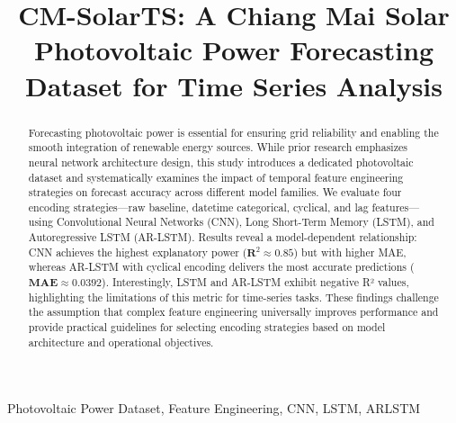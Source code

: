 \documentclass[conference]{IEEEtran}
\begin{document}
	
	\title{CM-SolarTS: A Chiang Mai Solar Photovoltaic Power Forecasting Dataset for Time Series Analysis \\
	}
	
	\author{
		
		\and
	}
	
	\maketitle
	
	\begin{abstract}
	Forecasting photovoltaic power is essential for ensuring grid reliability and enabling the smooth integration of renewable energy sources. While prior research emphasizes neural network architecture design, this study introduces a dedicated photovoltaic dataset and systematically examines the impact of temporal feature engineering strategies on forecast accuracy across different model families. We evaluate four encoding strategies—raw baseline, datetime categorical, cyclical, and lag features—using Convolutional Neural Networks (CNN), Long Short-Term Memory (LSTM), and Autoregressive LSTM (AR-LSTM). Results reveal a model-dependent relationship: CNN achieves the highest explanatory power ($\mathbf{R}^{2} \approx 0.85$) but with higher MAE, whereas AR-LSTM with cyclical encoding delivers the most accurate predictions ($\mathbf{MAE} \approx 0.0392$). Interestingly, LSTM and AR-LSTM exhibit negative R² values, highlighting the limitations of this metric for time-series tasks. These findings challenge the assumption that complex feature engineering universally improves performance and provide practical guidelines for selecting encoding strategies based on model architecture and operational objectives.
	\end{abstract}
	
	\begin{IEEEkeywords}
		Photovoltaic Power Dataset, Feature Engineering, CNN, LSTM, ARLSTM
	\end{IEEEkeywords}
	
\end{document}
